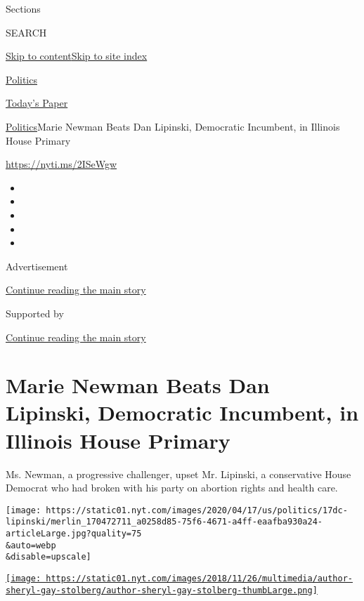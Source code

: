 Sections

SEARCH

\protect\hyperlink{site-content}{Skip to
content}\protect\hyperlink{site-index}{Skip to site index}

\href{https://www.nytimes.com/section/politics}{Politics}

\href{https://myaccount.nytimes.com/auth/login?response_type=cookie\&client_id=vi}{}

\href{https://www.nytimes.com/section/todayspaper}{Today's Paper}

\href{/section/politics}{Politics}\textbar{}Marie Newman Beats Dan
Lipinski, Democratic Incumbent, in Illinois House Primary

\url{https://nyti.ms/2ISeWgw}

\begin{itemize}
\item
\item
\item
\item
\item
\end{itemize}

Advertisement

\protect\hyperlink{after-top}{Continue reading the main story}

Supported by

\protect\hyperlink{after-sponsor}{Continue reading the main story}

\hypertarget{marie-newman-beats-dan-lipinski-democratic-incumbent-in-illinois-house-primary}{%
\section{Marie Newman Beats Dan Lipinski, Democratic Incumbent, in
Illinois House
Primary}\label{marie-newman-beats-dan-lipinski-democratic-incumbent-in-illinois-house-primary}}

Ms. Newman, a progressive challenger, upset Mr. Lipinski, a conservative
House Democrat who had broken with his party on abortion rights and
health care.

\texttt{[image: https://static01.nyt.com/images/2020/04/17/us/politics/17dc-lipinski/merlin\_170472711\_a0258d85-75f6-4671-a4ff-eaafba930a24-articleLarge.jpg?quality=75\\\&auto=webp\\\&disable=upscale]}

\href{https://www.nytimes.com/by/sheryl-gay-stolberg}{\texttt{[image: https://static01.nyt.com/images/2018/11/26/multimedia/author-sheryl-gay-stolberg/author-sheryl-gay-stolberg-thumbLarge.png]}}

